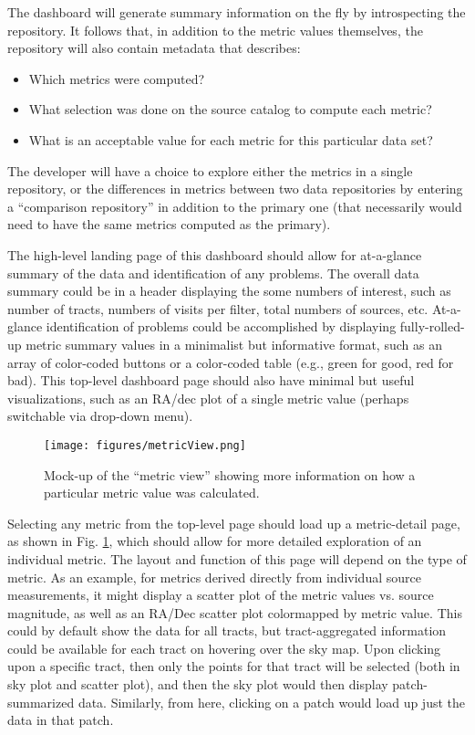 The dashboard will generate summary information on the fly by introspecting the repository.
It follows that, in addition to the metric values themselves, the repository will also contain metadata that describes:
\begin{itemize}
    \item{Which metrics were computed?}
    \item{What selection was done on the source catalog to compute each metric?}
    \item{What is an acceptable value for each metric for this particular data set?}
\end{itemize}
The developer will have a choice to explore either the metrics in a single repository, or the differences in metrics between two data repositories by entering a ``comparison repository'' in addition to the primary one (that necessarily would need to have the same metrics computed as the primary).

The high-level landing page of this dashboard should allow for at-a-glance summary of the data and identification of any problems.
The overall data summary could be in a header displaying the some numbers of interest, such as number of tracts, numbers of visits per filter, total numbers of sources, etc.
At-a-glance identification of problems could be accomplished by displaying fully-rolled-up metric summary values in a minimalist but informative format, such as an array of color-coded buttons or a color-coded table (e.g., green for good, red for bad).
This top-level dashboard page should also have minimal but useful visualizations, such as an RA/dec plot of a single metric value (perhaps switchable via drop-down menu).

\begin{figure}
  \begin{center}
    \texttt{[image: figures/metricView.png]}
  \end{center}
  \caption{
    Mock-up of the ``metric view'' showing more information on how a particular metric value was calculated.
  }
  \label{fig:comp:drill:metric}
\end{figure}

Selecting any metric from the top-level page should load up a metric-detail page, as shown in Fig. \ref{fig:comp:drill:metric}, which should allow for more detailed exploration of an individual metric.
The layout and function of this page will depend on the type of metric.
As an example, for metrics derived directly from individual source measurements, it might display a scatter plot of the metric values vs. source magnitude, as well as an RA/Dec scatter plot colormapped by metric value.
This could by default show the data for all tracts, but tract-aggregated information could be available for each tract on hovering over the sky map.
Upon clicking upon a specific tract, then only the points for that tract will be selected (both in sky plot and scatter plot), and then the sky plot would then display patch-summarized data.
Similarly, from here, clicking on a patch would load up just the data in that patch.

